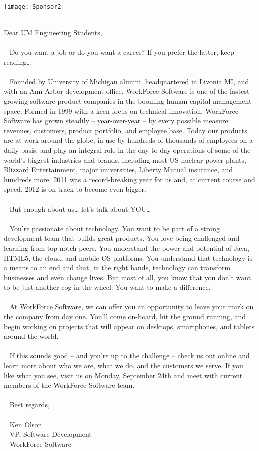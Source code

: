 \documentclass[twoside]{article}
\begin{document}
\begin{multicols}{2}
~\begin{center}\texttt{[image: Sponsor2]}\end{center}\\Dear UM Engineering Students, \\ ~ \\ ~ Do you want a job or do you want a career? If you prefer the latter, keep reading… \\ ~ \\ ~ Founded by University of Michigan alumni, headquartered in Livonia MI, and with an Ann Arbor development office, WorkForce Software is one of the fastest growing software product companies in the booming human capital management space. Formed in 1999 with a keen focus on technical innovation, WorkForce Software has grown steadily – year-over-year – by every possible measure: revenues, customers, product portfolio, and employee base. Today our products are at work around the globe, in use by hundreds of thousands of employees on a daily basis, and play an integral role in the day-to-day operations of some of the world’s biggest industries and brands, including most US nuclear power plants, Blizzard Entertainment, major universities, Liberty Mutual insurance, and hundreds more. 2011 was a record-breaking year for us and, at current course and speed, 2012 is on track to become even bigger. \\ ~ \\ ~ But enough about us… let’s talk about YOU… \\ ~ \\ ~ You’re passionate about technology. You want to be part of a strong development team that builds great products. You love being challenged and learning from top-notch peers. You understand the power and potential of Java, HTML5, the cloud, and mobile OS platforms. You understand that technology is a means to an end and that, in the right hands, technology can transform businesses and even change lives. But most of all, you know that you don’t want to be just another cog in the wheel. You want to make a difference. \\ ~ \\ ~ At WorkForce Software, we can offer you an opportunity to leave your mark on the company from day one. You’ll come on-board, hit the ground running, and begin working on projects that will appear on desktops, smartphones, and tablets around the world. \\ ~ \\ ~ If this sounds good – and you’re up to the challenge – check us out online and learn more about who we are, what we do, and the customers we serve. If you like what you see, visit us on Monday, September 24th and meet with current members of the WorkForce Software team. \\ ~ \\ ~ Best regards, \\ ~ \\ ~ Ken Olson \\ ~ VP, Software Development \\ ~ WorkForce Software 
\end{multicols}
\end{document}
